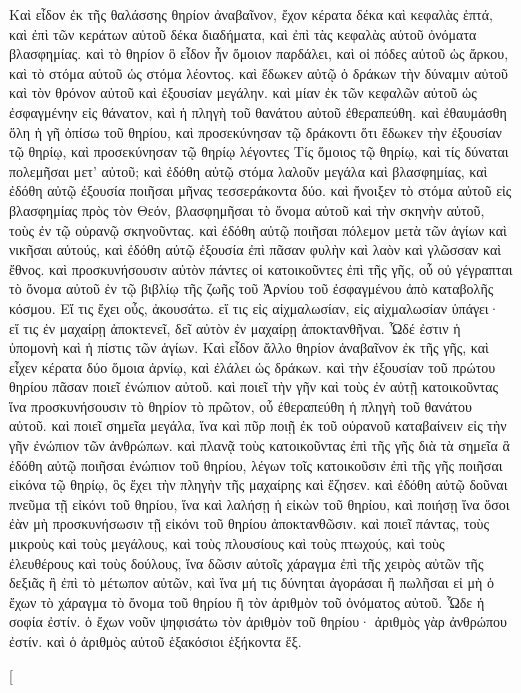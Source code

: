 \begin{pages}
    \begin{Rightside}
        \beginnumbering
		Καὶ εἶδον ἐκ τῆς θαλάσσης θηρίον ἀναβαῖνον, ἔχον κέρατα δέκα καὶ κεφαλὰς ἑπτά, καὶ ἐπὶ τῶν κεράτων αὐτοῦ δέκα διαδήματα, καὶ ἐπὶ τὰς κεφαλὰς αὐτοῦ ὀνόματα βλασφημίας. καὶ τὸ θηρίον ὃ εἶδον ἦν ὅμοιον παρδάλει, καὶ οἱ πόδες αὐτοῦ ὡς ἄρκου, καὶ τὸ στόμα αὐτοῦ ὡς στόμα λέοντος. καὶ ἔδωκεν αὐτῷ ὁ δράκων τὴν δύναμιν αὐτοῦ καὶ τὸν θρόνον αὐτοῦ καὶ ἐξουσίαν μεγάλην. 
		\pend
		\pstart
		καὶ μίαν ἐκ τῶν κεφαλῶν αὐτοῦ ὡς ἐσφαγμένην εἰς θάνατον, καὶ ἡ πληγὴ τοῦ θανάτου αὐτοῦ ἐθεραπεύθη. καὶ ἐθαυμάσθη ὅλη ἡ γῆ ὀπίσω τοῦ θηρίου, καὶ προσεκύνησαν τῷ δράκοντι ὅτι ἔδωκεν τὴν ἐξουσίαν τῷ θηρίῳ, καὶ προσεκύνησαν τῷ θηρίῳ λέγοντες Τίς ὅμοιος τῷ θηρίῳ, καὶ τίς δύναται πολεμῆσαι μετ’ αὐτοῦ; 
		\pend
		\pstart
		καὶ ἐδόθη αὐτῷ στόμα λαλοῦν μεγάλα καὶ βλασφημίας, καὶ ἐδόθη αὐτῷ ἐξουσία ποιῆσαι μῆνας τεσσεράκοντα δύο. καὶ ἤνοιξεν τὸ στόμα αὐτοῦ εἰς βλασφημίας πρὸς τὸν Θεόν, βλασφημῆσαι τὸ ὄνομα αὐτοῦ καὶ τὴν σκηνὴν αὐτοῦ, τοὺς ἐν τῷ οὐρανῷ σκηνοῦντας. 
		\pend
		\pstart
		καὶ ἐδόθη αὐτῷ ποιῆσαι πόλεμον μετὰ τῶν ἁγίων καὶ νικῆσαι αὐτούς, καὶ ἐδόθη αὐτῷ ἐξουσία ἐπὶ πᾶσαν φυλὴν καὶ λαὸν καὶ γλῶσσαν καὶ ἔθνος. καὶ προσκυνήσουσιν αὐτὸν πάντες οἱ κατοικοῦντες ἐπὶ τῆς γῆς, οὗ οὐ γέγραπται τὸ ὄνομα αὐτοῦ ἐν τῷ βιβλίῳ τῆς ζωῆς τοῦ Ἀρνίου τοῦ ἐσφαγμένου ἀπὸ καταβολῆς κόσμου. Εἴ τις ἔχει οὖς, ἀκουσάτω. εἴ τις εἰς αἰχμαλωσίαν, εἰς αἰχμαλωσίαν ὑπάγει· εἴ τις ἐν μαχαίρῃ ἀποκτενεῖ, δεῖ αὐτὸν ἐν μαχαίρῃ ἀποκτανθῆναι. Ὧδέ ἐστιν ἡ ὑπομονὴ καὶ ἡ πίστις τῶν ἁγίων. 
		\pend
		\pstart
		Καὶ εἶδον ἄλλο θηρίον ἀναβαῖνον ἐκ τῆς γῆς, καὶ εἶχεν κέρατα δύο ὅμοια ἀρνίῳ, καὶ ἐλάλει ὡς δράκων. καὶ τὴν ἐξουσίαν τοῦ πρώτου θηρίου πᾶσαν ποιεῖ ἐνώπιον αὐτοῦ. καὶ ποιεῖ τὴν γῆν καὶ τοὺς ἐν αὐτῇ κατοικοῦντας ἵνα προσκυνήσουσιν τὸ θηρίον τὸ πρῶτον, οὗ ἐθεραπεύθη ἡ πληγὴ τοῦ θανάτου αὐτοῦ. καὶ ποιεῖ σημεῖα μεγάλα, ἵνα καὶ πῦρ ποιῇ ἐκ τοῦ οὐρανοῦ καταβαίνειν εἰς τὴν γῆν ἐνώπιον τῶν ἀνθρώπων. 
		\pend
		\pstart
		καὶ πλανᾷ τοὺς κατοικοῦντας ἐπὶ τῆς γῆς διὰ τὰ σημεῖα ἃ ἐδόθη αὐτῷ ποιῆσαι ἐνώπιον τοῦ θηρίου, λέγων τοῖς κατοικοῦσιν ἐπὶ τῆς γῆς ποιῆσαι εἰκόνα τῷ θηρίῳ, ὃς ἔχει τὴν πληγὴν τῆς μαχαίρης καὶ ἔζησεν. καὶ ἐδόθη αὐτῷ δοῦναι πνεῦμα τῇ εἰκόνι τοῦ θηρίου, ἵνα καὶ λαλήσῃ ἡ εἰκὼν τοῦ θηρίου, καὶ ποιήσῃ ἵνα ὅσοι ἐὰν μὴ προσκυνήσωσιν τῇ εἰκόνι τοῦ θηρίου ἀποκτανθῶσιν. 
		\pend
		\pstart
		καὶ ποιεῖ πάντας, τοὺς μικροὺς καὶ τοὺς μεγάλους, καὶ τοὺς πλουσίους καὶ τοὺς πτωχούς, καὶ τοὺς ἐλευθέρους καὶ τοὺς δούλους, ἵνα δῶσιν αὐτοῖς χάραγμα ἐπὶ τῆς χειρὸς αὐτῶν τῆς δεξιᾶς ἢ ἐπὶ τὸ μέτωπον αὐτῶν, καὶ ἵνα μή τις δύνηται ἀγοράσαι ἢ πωλῆσαι εἰ μὴ ὁ ἔχων τὸ χάραγμα τὸ ὄνομα τοῦ θηρίου ἢ τὸν ἀριθμὸν τοῦ ὀνόματος αὐτοῦ. Ὧδε ἡ σοφία ἐστίν. ὁ ἔχων νοῦν ψηφισάτω τὸν ἀριθμὸν τοῦ θηρίου· ἀριθμὸς γὰρ ἀνθρώπου ἐστίν. καὶ ὁ ἀριθμὸς αὐτοῦ ἑξακόσιοι ἑξήκοντα ἕξ.
		\pend
        \endnumbering
    \end{Rightside}
    \begin{Leftside}
        \beginnumbering
        \pstart[

\end{Leftside}
\end{pages}
